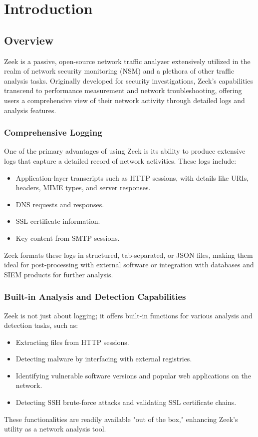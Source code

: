 \section{Introduction}
\subsection{Overview}
Zeek is a passive, open-source network traffic analyzer extensively utilized in the realm of network security monitoring (NSM) and a plethora of other traffic analysis tasks. Originally developed for security investigations, Zeek's capabilities transcend to performance measurement and network troubleshooting, offering users a comprehensive view of their network activity through detailed logs and analysis features.
\subsubsection{Comprehensive Logging}
One of the primary advantages of using Zeek is its ability to produce extensive logs that capture a detailed record of network activities. These logs include:
\begin{itemize}
    \item Application-layer transcripts such as HTTP sessions, with details like URIs, headers, MIME types, and server responses.
    \item DNS requests and responses.
    \item SSL certificate information.
    \item Key content from SMTP sessions.
\end{itemize}
Zeek formats these logs in structured, tab-separated, or JSON files, making them ideal for post-processing with external software or integration with databases and SIEM products for further analysis.


\subsubsection{Built-in Analysis and Detection Capabilities}
Zeek is not just about logging; it offers built-in functions for various analysis and detection tasks, such as:
\begin{itemize}
    \item Extracting files from HTTP sessions.
    \item Detecting malware by interfacing with external registries.
    \item Identifying vulnerable software versions and popular web applications on the network.
    \item Detecting SSH brute-force attacks and validating SSL certificate chains.
\end{itemize}
These functionalities are readily available "out of the box," enhancing Zeek's utility as a network analysis tool.

